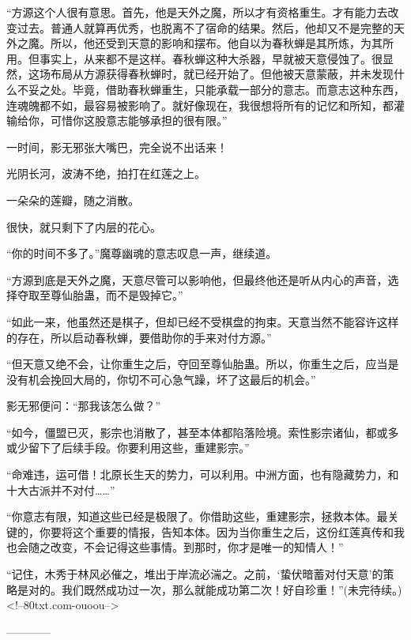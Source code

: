 \begin{this_body}
“方源这个人很有意思。首先，他是天外之魔，所以才有资格重生。才有能力去改变过去。普通人就算再优秀，也脱离不了宿命的结果。然后，他却又不是完整的天外之魔。所以，他还受到天意的影响和摆布。他自以为春秋蝉是其所炼，为其所用。但事实上，从来都不是这样。春秋蝉这种大杀器，早就被天意侵蚀了。很显然，这场布局从方源获得春秋蝉时，就已经开始了。但他被天意蒙蔽，并未发现什么不妥之处。毕竟，借助春秋蝉重生，只能承载一部分的意志。而意志这种东西，连魂魄都不如，最容易被影响了。就好像现在，我很想将所有的记忆和所知，都灌输给你，可惜你这股意志能够承担的很有限。”

一时间，影无邪张大嘴巴，完全说不出话来！

光阴长河，波涛不绝，拍打在红莲之上。

一朵朵的莲瓣，随之消散。

很快，就只剩下了内层的花心。

“你的时间不多了。”魔尊幽魂的意志叹息一声，继续道。

“方源到底是天外之魔，天意尽管可以影响他，但最终他还是听从内心的声音，选择夺取至尊仙胎蛊，而不是毁掉它。”

“如此一来，他虽然还是棋子，但却已经不受棋盘的拘束。天意当然不能容许这样的存在，所以启动春秋蝉，要借助你的手来对付方源。”

“但天意又绝不会，让你重生之后，夺回至尊仙胎蛊。所以，你重生之后，应当是没有机会挽回大局的，你切不可心急气躁，坏了这最后的机会。”

影无邪便问：“那我该怎么做？”

“如今，僵盟已灭，影宗也消散了，甚至本体都陷落险境。索性影宗诸仙，都或多或少留下了后续手段。你要利用这些，重建影宗。”

“命难违，运可借！北原长生天的势力，可以利用。中洲方面，也有隐藏势力，和十大古派并不对付……”

“你意志有限，知道这些已经是极限了。你借助这些，重建影宗，拯救本体。最关键的，你要将这个重要的情报，告知本体。因为当你重生之后，这份红莲真传和我也会随之改变，不会记得这些事情。到那时，你才是唯一的知情人！”

“记住，木秀于林风必催之，堆出于岸流必湍之。之前，‘蛰伏暗蓄对付天意’的策略是对的。我们既然成功过一次，那么就能成功第二次！好自珍重！”(未完待续。)<!--80txt.com-ouoou-->

------------

\end{this_body}

